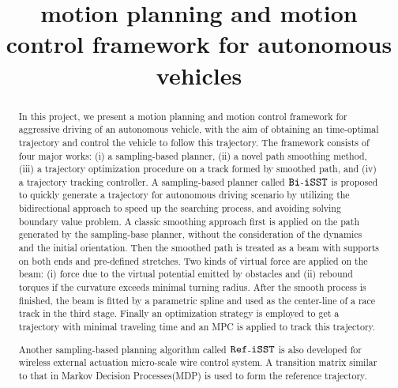 \documentclass[conference, onecolumn]{IEEEtran}
\begin{document}
	\title{motion planning and motion control framework for autonomous vehicles}
	\maketitle{}

\begin{abstract}
	In this project, we present a motion planning and motion control framework for aggressive driving of an autonomous vehicle, with the aim of obtaining an time-optimal trajectory and control the vehicle to follow this trajectory. The framework consists of four major works: (i) a sampling-based planner, (ii) a novel path smoothing method, (iii) a trajectory optimization procedure on a track formed by smoothed path, and (iv) a trajectory tracking controller. A sampling-based planner called $\tt Bi$-$\tt iSST$ is proposed to quickly generate a trajectory for autonomous driving scenario by utilizing the bidirectional approach to speed up the searching process, and avoiding solving boundary value problem. A classic smoothing approach first is applied on the path generated by the sampling-base planner, without the consideration of the dynamics and the initial orientation. Then the smoothed path is treated as a beam with supports on both ends and pre-defined stretches. Two kinds of virtual force are applied on the beam: (i) force due to the virtual potential emitted by obstacles and (ii) rebound torques if the curvature exceeds minimal turning radius. After the smooth process is finished, the beam is fitted by a parametric spline and used as the center-line of a race track in the third stage. Finally an optimization strategy is employed to get a trajectory with minimal traveling time and an MPC is applied to track this trajectory. 
	
	Another sampling-based planning algorithm called $\tt Ref$-$\tt iSST$ is also developed for wireless external actuation micro-scale wire control system. A transition matrix similar to that in Markov Decision Processes(MDP) is used to form the reference trajectory.
\end{abstract}
\end{document}
